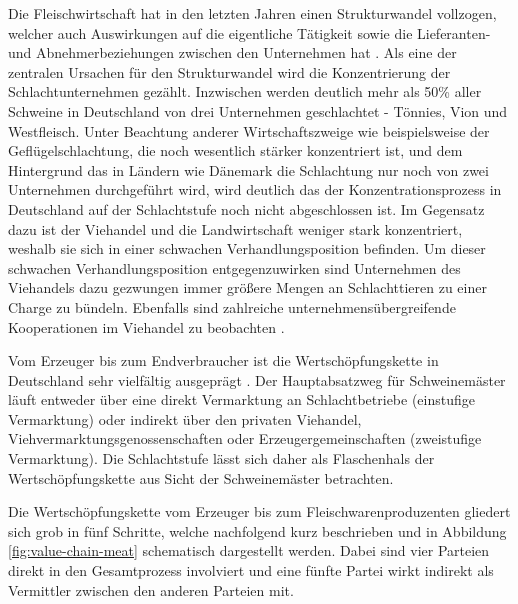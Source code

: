 Die Fleischwirtschaft hat in den letzten Jahren einen Strukturwandel vollzogen, welcher auch Auswirkungen auf die eigentliche Tätigkeit sowie die Lieferanten- und Abnehmerbeziehungen zwischen den Unternehmen hat \citep{Nolte2006}. Als eine der zentralen Ursachen für den Strukturwandel wird die Konzentrierung der Schlachtunternehmen gezählt. Inzwischen werden deutlich mehr als 50\% aller Schweine in Deutschland von drei Unternehmen geschlachtet - Tönnies, Vion und Westfleisch. Unter Beachtung anderer Wirtschaftszweige wie beispielsweise der Geflügelschlachtung, die noch wesentlich stärker konzentriert ist, und dem Hintergrund das in Ländern wie Dänemark die Schlachtung nur noch von zwei Unternehmen durchgeführt wird, wird deutlich das der Konzentrationsprozess in Deutschland auf der Schlachtstufe noch nicht abgeschlossen ist. Im Gegensatz dazu ist der Viehandel und die Landwirtschaft weniger stark konzentriert, weshalb sie sich in einer schwachen Verhandlungsposition befinden. Um dieser schwachen Verhandlungsposition entgegenzuwirken sind Unternehmen des Viehandels dazu gezwungen immer größere Mengen an Schlachttieren zu einer Charge zu bündeln. Ebenfalls sind zahlreiche unternehmensübergreifende Kooperationen im Viehandel zu beobachten \citep{Voss2010}.

Vom Erzeuger bis zum Endverbraucher ist die Wertschöpfungskette in Deutschland sehr vielfältig ausgeprägt \citep{Freund1997}. Der Hauptabsatzweg für Schweinemäster läuft entweder über eine direkt Vermarktung an Schlachtbetriebe (einstufige Vermarktung) oder indirekt über den privaten Viehandel, Viehvermarktungsgenossenschaften oder Erzeugergemeinschaften (zweistufige Vermarktung). Die Schlachtstufe lässt sich daher als Flaschenhals der Wertschöpfungskette aus Sicht der Schweinemäster betrachten.

Die Wertschöpfungskette vom Erzeuger bis zum Fleischwarenproduzenten gliedert sich grob in fünf Schritte, welche nachfolgend kurz beschrieben und in Abbildung \ref{fig:value-chain-meat} schematisch dargestellt werden. Dabei sind vier Parteien direkt in den Gesamtprozess involviert und eine fünfte Partei wirkt indirekt als Vermittler zwischen den anderen Parteien mit.

